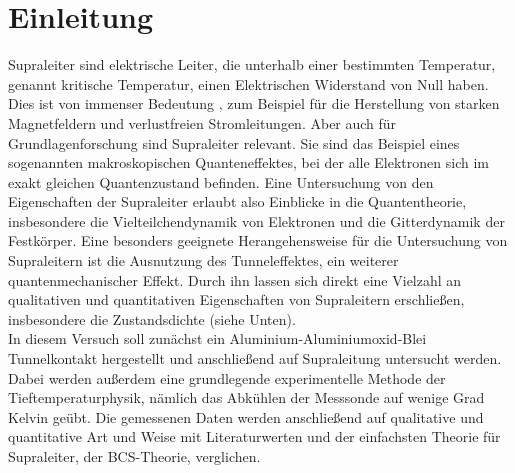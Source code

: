 \documentclass[twoside,        %
               BCOR12mm,       %
               english,ngerman, %
               fleqn,headsepline=false,footsepline=false
              ]{Vorlage/MFPREPORT}
\begin{document}
\date{\today}
\CopyNotWanted

\maketitle


\tableofcontents

\clearpage
{}

\section{Einleitung}
\label{sec:einleitung}
Supraleiter sind elektrische Leiter, die unterhalb einer bestimmten Temperatur,
genannt kritische Temperatur, einen Elektrischen Widerstand von Null haben.
Dies ist von immenser Bedeutung , zum Beispiel für die Herstellung von starken Magnetfeldern
und verlustfreien Stromleitungen. Aber auch für Grundlagenforschung sind
Supraleiter relevant. Sie sind das Beispiel eines sogenannten makroskopischen
Quanteneffektes, bei der alle Elektronen sich im exakt gleichen Quantenzustand
befinden. Eine Untersuchung von den Eigenschaften der Supraleiter erlaubt also
Einblicke in die Quantentheorie, insbesondere die Vielteilchendynamik von
Elektronen und die Gitterdynamik der Festkörper.
Eine besonders geeignete Herangehensweise für die Untersuchung von Supraleitern
ist die Ausnutzung des Tunneleffektes, ein weiterer quantenmechanischer Effekt.
Durch ihn lassen sich direkt eine Vielzahl an qualitativen und quantitativen
Eigenschaften von Supraleitern erschließen, insbesondere die Zustandsdichte
(siehe Unten).\\
In diesem Versuch soll zunächst ein Aluminium-Aluminiumoxid-Blei Tunnelkontakt
hergestellt und anschließend auf Supraleitung untersucht werden. Dabei werden
außerdem eine grundlegende experimentelle Methode der Tieftemperaturphysik,
nämlich das Abkühlen der Messsonde auf wenige Grad Kelvin geübt.
Die gemessenen Daten werden anschließend auf qualitative und quantitative Art
und Weise mit Literaturwerten und der einfachsten Theorie für Supraleiter, der
BCS-Theorie, verglichen.
\end{document}
